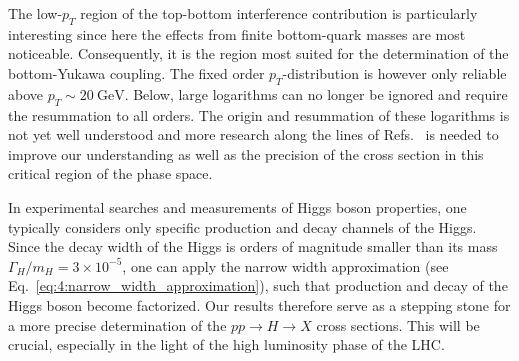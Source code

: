 The low-$p_T$ region of the top-bottom interference contribution is particularly interesting since here the effects from finite bottom-quark masses are most noticeable. Consequently, it is the region most suited for the determination of the bottom-Yukawa coupling. The fixed order $p_T$-distribution is however only reliable above $p_T \sim 20 \ \mathrm{GeV}$. Below, large logarithms can no longer be ignored and require the resummation to all orders. The origin and resummation of these logarithms is not yet well understood and more research along the lines of Refs.~\cite{Caola:2018zye, Liu:2017vkm} is needed to improve our understanding as well as the precision of the cross section in this critical region of the phase space.

In experimental searches and measurements of Higgs boson properties, one typically considers only specific production and decay channels of the Higgs. Since the decay width of the Higgs is orders of magnitude smaller than its mass $\Gamma_H /m_H = 3 \times 10^{-5}$, one can apply the narrow width approximation (see Eq.~\eqref{eq:4:narrow_width_approximation}), such that production and decay of the Higgs boson become factorized. Our results therefore serve as a stepping stone for a more precise determination of the $pp \rightarrow H \rightarrow X$ cross sections. This will be crucial, especially in the light of the high luminosity phase of the \acs{LHC}.